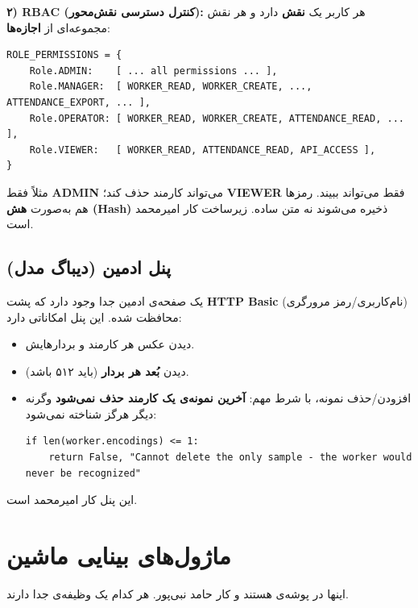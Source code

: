 \documentclass[12pt,a4paper]{article}
\begin{document}
\textbf{۲) RBAC (کنترل دسترسی نقش‌محور):} هر کاربر یک \textbf{نقش} دارد و هر نقش مجموعه‌ای از \textbf{اجازه‌ها}:

\begin{latin}
\begin{lstlisting}
ROLE_PERMISSIONS = {
    Role.ADMIN:    [ ... all permissions ... ],
    Role.MANAGER:  [ WORKER_READ, WORKER_CREATE, ..., ATTENDANCE_EXPORT, ... ],
    Role.OPERATOR: [ WORKER_READ, WORKER_CREATE, ATTENDANCE_READ, ... ],
    Role.VIEWER:   [ WORKER_READ, ATTENDANCE_READ, API_ACCESS ],
}
\end{lstlisting}
\end{latin}

مثلاً فقط \textbf{ADMIN} می‌تواند کارمند حذف کند؛ \textbf{VIEWER} فقط می‌تواند ببیند. رمزها هم به‌صورت \textbf{هش (Hash)} ذخیره می‌شوند نه متن ساده. زیرساخت  کار امیرمحمد است.

\subsection{پنل ادمین (دیباگ مدل)}
یک صفحه‌ی ادمین جدا وجود دارد که پشت \textbf{HTTP Basic} (نام‌کاربری/رمز مرورگری) محافظت شده. این پنل امکاناتی دارد:
\begin{itemize}[rightmargin=0pt]
  \item دیدن عکس هر کارمند و بردارهایش.
  \item دیدن \textbf{بُعد هر بردار} (باید ۵۱۲ باشد).
  \item افزودن/حذف نمونه، با شرط مهم: \textbf{آخرین نمونه‌ی یک کارمند حذف نمی‌شود} وگرنه دیگر هرگز شناخته نمی‌شود:
\begin{latin}
\begin{lstlisting}
if len(worker.encodings) <= 1:
    return False, "Cannot delete the only sample - the worker would never be recognized"
\end{lstlisting}
\end{latin}
\end{itemize}
این پنل کار امیرمحمد است.

\section{ماژول‌های بینایی ماشین}
اینها در پوشه‌ی  هستند و کار حامد نبی‌پور. هر کدام یک وظیفه‌ی جدا دارند.
\end{document}
